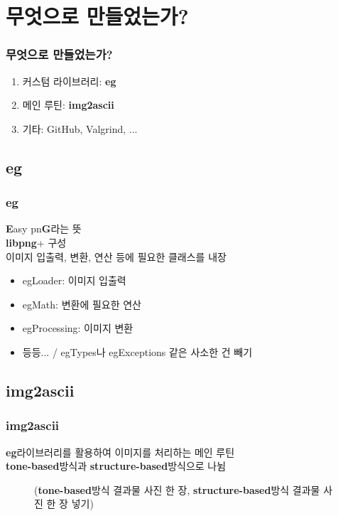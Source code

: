 \documentclass{beamer}
\newcommand{\spacing}{\hspace{0.3em}}
\newcommand{\eg}{\textbf{eg}}
\newcommand{\imgascii}{\textbf{img2ascii}}
\newcommand{\libpng}{\textbf{libpng}}
\newcommand{\Eigen}{\textbf{Eigen}}
\newcommand{\tonebased}{\textbf{tone-based}}
\newcommand{\structurebased}{\textbf{structure-based}}
\begin{document}
\section{무엇으로 만들었는가?}
\begin{frame}{}
	\frametitle{무엇으로 만들었는가?}
	\begin{enumerate}
		\item 커스텀 라이브러리: \eg
		\item 메인 루틴: \imgascii
		\item 기타: GitHub, Valgrind, ...
	\end{enumerate}
\end{frame}

	\subsection{\eg}
	\begin{frame}{}
		\frametitle{\eg}
		\textbf{E}asy pn\textbf{G}라는 뜻 \\
		\libpng \spacing +  구성 \\
		이미지 입출력, 변환, 연산 등에 필요한 클래스를 내장
		\vspace{1em}
		\begin{itemize}
			\item egLoader: 이미지 입출력
			\item egMath: 변환에 필요한 연산
			\item egProcessing: 이미지 변환
			\item 등등... / egTypes나 egExceptions 같은 사소한 건 빼기
		\end{itemize}
	\end{frame}

	\subsection{\imgascii}
	\begin{frame}{}
		\frametitle{\imgascii}
		\eg \spacing 라이브러리를 활용하여 이미지를 처리하는 메인 루틴 \\
		\tonebased \spacing 방식과 \structurebased \spacing 방식으로 나뉨
		\begin{figure}
			(\tonebased \spacing 방식 결과물 사진 한 장, \structurebased \spacing 방식 결과물 사진 한 장 넣기)
		\end{figure}
	\end{frame}
\end{document}
